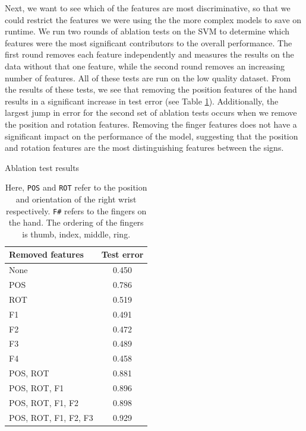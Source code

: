 \documentclass[twocolumn]{article}
\begin{document}
Next, we want to see which of the features are most discriminative, so that we could restrict the features we were using the the more complex models to save on runtime. We run two rounds of ablation tests on the SVM to determine which features were the most significant contributors to the overall performance.  The first round removes each feature independently and measures the results on the data without that one feature, while the second round removes an increasing number of features. All of these tests are run on the low quality dataset. From the results of these tests, we see that removing the position features of the hand results in a significant increase in test error (see Table \ref{table:ablation}). Additionally, the largest jump in error for the second set of ablation tests occurs when we remove the position and rotation features. Removing the finger features does not have a significant impact on the performance of the model, suggesting that the position and rotation features are the most distinguishing features between the signs.


\begin{table}[h]
    \centering
    \caption{Ablation test results}
    \label{table:ablation}
        \begin{tabular}{|l|c|}
        \hline
        Removed features & Test error \\ \hline
        None & 0.450 \\ \arrayrulecolor{gray}\hline\arrayrulecolor{black}
        \rowcolor{lightgray} POS & 0.786 \\ \arrayrulecolor{gray}\hline\arrayrulecolor{black}
        ROT & 0.519 \\ \arrayrulecolor{gray}\hline\arrayrulecolor{black}
        F1 & 0.491 \\ \arrayrulecolor{gray}\hline\arrayrulecolor{black}
        F2 & 0.472 \\ \arrayrulecolor{gray}\hline\arrayrulecolor{black}
        F3 & 0.489 \\ \arrayrulecolor{gray}\hline\arrayrulecolor{black}
        F4 & 0.458 \\ \arrayrulecolor{gray}\hline\arrayrulecolor{black}
        POS, ROT & 0.881 \\ \arrayrulecolor{gray}\hline\arrayrulecolor{black}
        POS, ROT, F1 & 0.896 \\ \arrayrulecolor{gray}\hline\arrayrulecolor{black}
        POS, ROT, F1, F2 & 0.898 \\ \arrayrulecolor{gray}\hline\arrayrulecolor{black}
        POS, ROT, F1, F2, F3 & 0.929 \\ \hline
        \end{tabular}
    \caption*{\small{Here, \texttt{POS} and \texttt{ROT} refer to the position and orientation of the right wrist respectively. \texttt{F\#} refers to the fingers on the hand. The ordering of the fingers is thumb, index, middle, ring.}}
\end{table}
\end{document}
